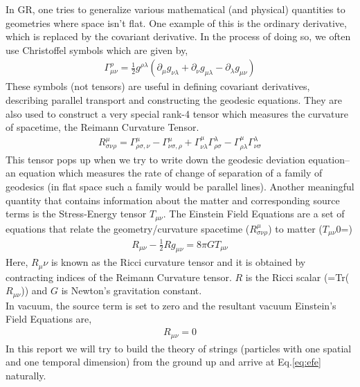 \documentclass{article}
\begin{document}
In GR, one tries to generalize various mathematical (and physical) quantities to geometries where space isn't flat. One example of this is the ordinary derivative, which is replaced by the covariant derivative. In the process of doing so, we often use Christoffel symbols which are given by,
\begin{align}
    \Gamma^\rho_{\mu\nu} = \frac{1}{2}g^{\rho\lambda}(\partial_\mu g_{\nu\lambda}+\partial_\nu g_{\mu\lambda}-\partial_\lambda g_{\mu\nu})
\end{align}
These symbols (not tensors) are useful in defining covariant derivatives, describing parallel transport and constructing the geodesic equations. They are also used to construct a very special rank-4 tensor which measures the curvature of spacetime, the Reimann Curvature Tensor. 
\begin{align}
    R^\mu_{\sigma\nu\rho} = \Gamma^\mu_{\rho\sigma,\nu}-\Gamma^\mu_{\nu\sigma,\rho}+\Gamma^\mu_{\nu\lambda}\Gamma^\lambda_{\rho\sigma}-\Gamma^\mu_{\rho\lambda}\Gamma^\lambda_{\nu\sigma}
\end{align}
This tensor pops up when we try to write down the geodesic deviation equation-- an equation which measures the rate of change of separation of a family of geodesics (in flat space such a family would be parallel lines). Another meaningful quantity that contains information about the matter and corresponding source terms is the Stress-Energy tensor $T_{\mu\nu}$. The Einstein Field Equations are a set of equations that relate the geometry/curvature spacetime ($R^\mu_{\sigma\nu\rho}$) to matter ($T_{\mu\nu}$0=)
\begin{align}
    R_{\mu\nu}-\frac{1}{2}Rg_{\mu\nu} = 8\pi GT_{\mu\nu}
\end{align}
Here, $R_\mu\nu$ is known as the Ricci curvature tensor and it is obtained by contracting indices of the Reimann Curvature tensor. $R$ is the Ricci scalar (=Tr($R_{\mu\nu}$)) and $G$ is Newton's gravitation constant.\\

In vacuum, the source term is set to zero and the resultant vacuum Einstein's Field Equations are,
\begin{align}
    R_{\mu\nu}=0\label{eq:efe}
\end{align}
In this report we will try to build the theory of strings (particles with one spatial and one temporal dimension) from the ground up and arrive at Eq.\eqref{eq:efe} naturally.
\end{document}
